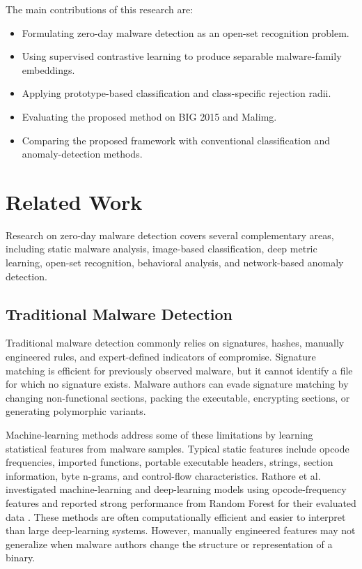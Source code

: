 \documentclass[12pt,a4paper]{article}
\begin{document}
The main contributions of this research are:

\begin{itemize}
    \item Formulating zero-day malware detection as an open-set recognition problem.
    \item Using supervised contrastive learning to produce separable malware-family embeddings.
    \item Applying prototype-based classification and class-specific rejection radii.
    \item Evaluating the proposed method on BIG 2015 and Malimg.
    \item Comparing the proposed framework with conventional classification and anomaly-detection methods.
\end{itemize}

\section{Related Work}

Research on zero-day malware detection covers several complementary areas, including static malware analysis, image-based classification, deep metric learning, open-set recognition, behavioral analysis, and network-based anomaly detection.

\subsection{Traditional Malware Detection}

Traditional malware detection commonly relies on signatures, hashes, manually engineered rules, and expert-defined indicators of compromise. Signature matching is efficient for previously observed malware, but it cannot identify a file for which no signature exists. Malware authors can evade signature matching by changing non-functional sections, packing the executable, encrypting sections, or generating polymorphic variants.

Machine-learning methods address some of these limitations by learning statistical features from malware samples. Typical static features include opcode frequencies, imported functions, portable executable headers, strings, section information, byte n-grams, and control-flow characteristics. Rathore et al. investigated machine-learning and deep-learning models using opcode-frequency features and reported strong performance from Random Forest for their evaluated data \citep{rathore2018}. These methods are often computationally efficient and easier to interpret than large deep-learning systems. However, manually engineered features may not generalize when malware authors change the structure or representation of a binary.
\end{document}
